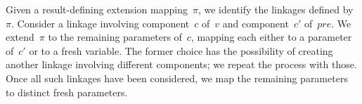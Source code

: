 


Given a result-defining extension mapping~$\pi$, we identify the linkages
defined by~$\pi$.  Consider a linkage involving component~$c$ of~$v$ and
component~$c'$ of~$pre$.  We extend~$\pi$ to the remaining parameters of~$c$,
mapping each either to a parameter of~$c'$ or to a fresh variable.  The former
choice has the possibility of creating another linkage involving different
components; we repeat the process with those.  Once all such linkages have
been considered, we map the remaining parameters to distinct fresh
parameters. 


